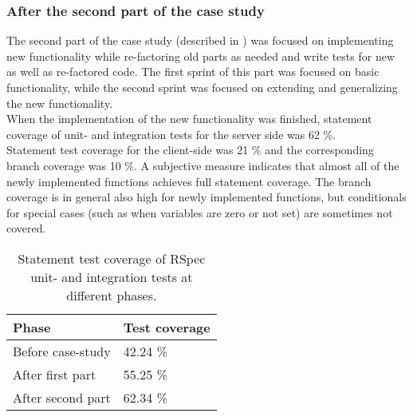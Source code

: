 \subsubsection{After the second part of the case study}

The second part of the case study (described in )
was focused on implementing new functionality while re-factoring old
parts as needed and write tests for new as well as re-factored code. The
first sprint of this part was focused on basic functionality, while the
second sprint was focused on extending and generalizing the new
functionality.\\

When the implementation of the new functionality was finished, statement
coverage of unit- and integration tests for the server side was 62 \%.\\

Statement test coverage for the client-side was 21 \% and the
corresponding branch coverage was 10 \%. A subjective measure
indicates that almost all of the newly implemented functions achieves
full statement coverage. The branch coverage is in general also high for
newly implemented functions, but conditionals for special cases (such as
when variables are zero or not set) are sometimes not covered.\\


\begin{table}[t]
    \centering
    \begin{tabular}{l l}
        Phase & Test coverage\\
        \hline
        Before case-study & 42.24 \%\\
        After first part  & 55.25 \%\\
        After second part & 62.34 \%\\
    \end{tabular}
    \caption{ Statement test coverage of RSpec unit- and integration tests at different phases. }
    \label{tab:unit_coverage}
\end{table}
